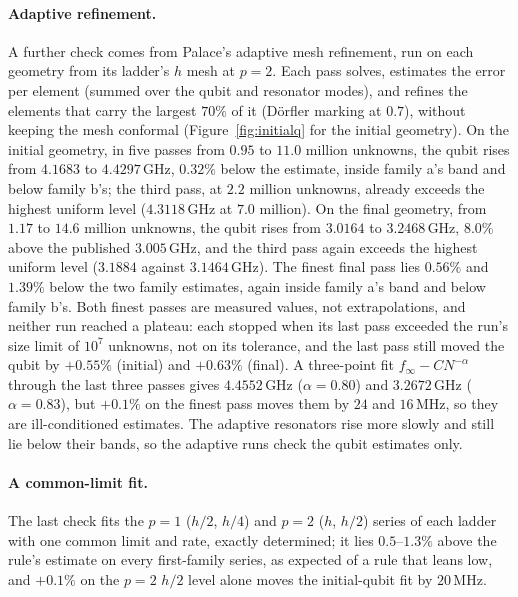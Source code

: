 \documentclass{anvil-paper}
\begin{document}
\paragraph{Adaptive refinement.}
A further check comes from Palace's adaptive mesh refinement, run on each
geometry from its ladder's $h$ mesh at $p = 2$. Each pass solves, estimates
the error per element (summed over the qubit and resonator modes), and
refines the elements that carry the largest $70\%$ of it (D\"orfler
marking at $0.7$), without keeping the mesh conformal
(Figure~\ref{fig:initialq} for the initial geometry). On the initial
geometry, in five passes from $0.95$ to $11.0$ million unknowns, the qubit
rises from $4.1683$ to $4.4297$\,GHz, $0.32\%$ below the estimate, inside
family a's band and below family b's; the third pass, at $2.2$ million unknowns, already exceeds the
highest uniform level ($4.3118$\,GHz at $7.0$ million). On the final
geometry, from $1.17$ to $14.6$ million unknowns, the qubit rises from
$3.0164$ to $3.2468$\,GHz, $8.0\%$ above the published $3.005$\,GHz, and
the third pass again exceeds the highest uniform level ($3.1884$ against
$3.1464$\,GHz). The finest final pass lies $0.56\%$ and $1.39\%$ below the
two family estimates, again inside family a's band and below family b's. Both finest passes are measured
values, not extrapolations, and neither run reached a plateau: each stopped
when its last pass exceeded the run's size limit of $10^7$ unknowns, not on
its tolerance, and the last pass still moved the qubit by $+0.55\%$ (initial)
and $+0.63\%$ (final). A three-point fit $f_\infty - CN^{-\alpha}$ through
the last three passes gives $4.4552$\,GHz ($\alpha = 0.80$) and
$3.2672$\,GHz ($\alpha = 0.83$), but $+0.1\%$ on the finest pass moves
them by $24$ and $16$\,MHz, so they are ill-conditioned estimates. The
adaptive resonators rise more slowly and still lie below their bands, so
the adaptive runs check the qubit estimates only.

\paragraph{A common-limit fit.}
The last check fits the $p = 1$ ($h/2$, $h/4$) and $p = 2$ ($h$, $h/2$)
series of each ladder with one common limit and rate, exactly determined; it lies
$0.5$--$1.3\%$ above the rule's estimate on every first-family series, as
expected of a rule that leans low, and $+0.1\%$ on the $p = 2$ $h/2$ level
alone moves the initial-qubit fit by $20$\,MHz.
\end{document}
